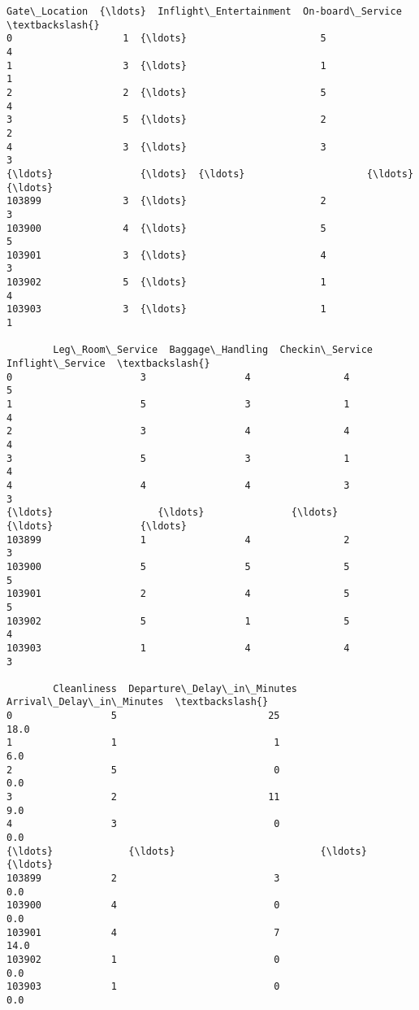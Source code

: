 \documentclass[11pt]{article}
\begin{document}
\begin{tcolorbox}[breakable, size=fbox, boxrule=.5pt, pad at break*=1mm, opacityfill=0]
\begin{Verbatim}[commandchars=\\\{\}]
        Gate\_Location  {\ldots}  Inflight\_Entertainment  On-board\_Service  \textbackslash{}
0                   1  {\ldots}                       5                 4
1                   3  {\ldots}                       1                 1
2                   2  {\ldots}                       5                 4
3                   5  {\ldots}                       2                 2
4                   3  {\ldots}                       3                 3
{\ldots}               {\ldots}  {\ldots}                     {\ldots}               {\ldots}
103899              3  {\ldots}                       2                 3
103900              4  {\ldots}                       5                 5
103901              3  {\ldots}                       4                 3
103902              5  {\ldots}                       1                 4
103903              3  {\ldots}                       1                 1

        Leg\_Room\_Service  Baggage\_Handling  Checkin\_Service  Inflight\_Service  \textbackslash{}
0                      3                 4                4                 5
1                      5                 3                1                 4
2                      3                 4                4                 4
3                      5                 3                1                 4
4                      4                 4                3                 3
{\ldots}                  {\ldots}               {\ldots}              {\ldots}               {\ldots}
103899                 1                 4                2                 3
103900                 5                 5                5                 5
103901                 2                 4                5                 5
103902                 5                 1                5                 4
103903                 1                 4                4                 3

        Cleanliness  Departure\_Delay\_in\_Minutes  Arrival\_Delay\_in\_Minutes  \textbackslash{}
0                 5                          25                      18.0
1                 1                           1                       6.0
2                 5                           0                       0.0
3                 2                          11                       9.0
4                 3                           0                       0.0
{\ldots}             {\ldots}                         {\ldots}                       {\ldots}
103899            2                           3                       0.0
103900            4                           0                       0.0
103901            4                           7                      14.0
103902            1                           0                       0.0
103903            1                           0                       0.0


\end{Verbatim}
\end{tcolorbox}
\end{document}
